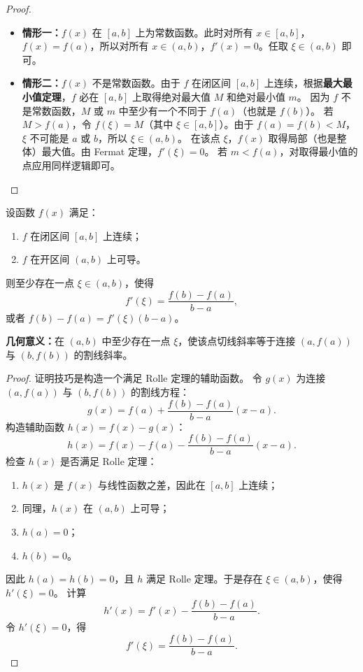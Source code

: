 \begin{proof}
\begin{itemize}
    \item \textbf{情形一：}$f(x)$ 在 $[a,b]$ 上为常数函数。此时对所有 $x\in [a,b]$，$f(x)=f(a)$，所以对所有 $x\in(a,b)$，$f'(x)=0$。任取 $\xi\in(a,b)$ 即可。
    \item \textbf{情形二：}$f(x)$ 不是常数函数。由于 $f$ 在闭区间 $[a,b]$ 上连续，根据\textbf{最大最小值定理}，$f$ 必在 $[a,b]$ 上取得绝对最大值 $M$ 和绝对最小值 $m$。
    因为 $f$ 不是常数函数，$M$ 或 $m$ 中至少有一个不同于 $f(a)$（也就是 $f(b)$）。
    若 $M>f(a)$，令 $f(\xi)=M$（其中 $\xi\in [a,b]$）。由于 $f(a)=f(b)<M$，$\xi$ 不可能是 $a$ 或 $b$，所以 $\xi\in(a,b)$。
    在该点 $\xi$，$f(x)$ 取得局部（也是整体）最大值。由 Fermat 定理，$f'(\xi)=0$。
    若 $m<f(a)$，对取得最小值的点应用同样逻辑即可。
\end{itemize}
\end{proof}

\begin{theorem}
\label{thm:lagrange_cn}
设函数 $f(x)$ 满足：
\begin{enumerate}
    \item $f$ 在闭区间 $[a,b]$ 上连续；
    \item $f$ 在开区间 $(a,b)$ 上可导。
\end{enumerate}
则至少存在一点 $\xi\in(a,b)$，使得
\[
f'(\xi)=\frac{f(b)-f(a)}{b-a},
\]
或者 $f(b)-f(a)=f'(\xi)(b-a)$。
\end{theorem}

\textbf{几何意义：}在 $(a,b)$ 中至少存在一点 $\xi$，使该点切线斜率等于连接 $(a,f(a))$ 与 $(b,f(b))$ 的割线斜率。

\begin{proof}
证明技巧是构造一个满足 Rolle 定理的辅助函数。
令 $g(x)$ 为连接 $(a,f(a))$ 与 $(b,f(b))$ 的割线方程：
\[
g(x)=f(a)+\frac{f(b)-f(a)}{b-a}(x-a).
\]
构造辅助函数 $h(x)=f(x)-g(x)$：
\[
h(x)=f(x)-f(a)-\frac{f(b)-f(a)}{b-a}(x-a).
\]
检查 $h(x)$ 是否满足 Rolle 定理：
\begin{enumerate}
    \item $h(x)$ 是 $f(x)$ 与线性函数之差，因此在 $[a,b]$ 上连续；
    \item 同理，$h(x)$ 在 $(a,b)$ 上可导；
    \item $h(a)=0$；
    \item $h(b)=0$。
\end{enumerate}
因此 $h(a)=h(b)=0$，且 $h$ 满足 Rolle 定理。于是存在 $\xi\in(a,b)$，使得 $h'(\xi)=0$。
计算
\[
h'(x)=f'(x)-\frac{f(b)-f(a)}{b-a}.
\]
令 $h'(\xi)=0$，得
\[
f'(\xi)=\frac{f(b)-f(a)}{b-a}.
\]
\end{proof}

